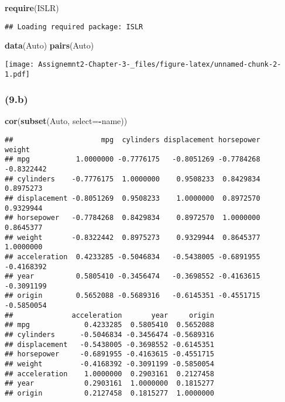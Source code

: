 \documentclass[]{article}
\newenvironment{Shaded}{\begin{snugshade}}{\end{snugshade}}
\newcommand{\DataTypeTok}[1]{\textcolor[rgb]{0.13,0.29,0.53}{#1}}
\newcommand{\KeywordTok}[1]{\textcolor[rgb]{0.13,0.29,0.53}{\textbf{#1}}}
\newcommand{\NormalTok}[1]{#1}
\newcommand{\OperatorTok}[1]{\textcolor[rgb]{0.81,0.36,0.00}{\textbf{#1}}}
\begin{document}
\begin{Shaded}
\begin{Highlighting}[]
\KeywordTok{require}\NormalTok{(ISLR)}
\end{Highlighting}
\end{Shaded}

\begin{verbatim}
## Loading required package: ISLR
\end{verbatim}

\begin{Shaded}
\begin{Highlighting}[]
\KeywordTok{data}\NormalTok{(Auto)}
\KeywordTok{pairs}\NormalTok{(Auto)}
\end{Highlighting}
\end{Shaded}

\texttt{[image: Assignemnt2-Chapter-3-\_files/figure-latex/unnamed-chunk-2-1.pdf]}

\hypertarget{b-1}{%
\subsubsection{(9.b)}\label{b-1}}

\begin{Shaded}
\begin{Highlighting}[]
\KeywordTok{cor}\NormalTok{(}\KeywordTok{subset}\NormalTok{(Auto, }\DataTypeTok{select=}\OperatorTok{-}\NormalTok{name))}
\end{Highlighting}
\end{Shaded}

\begin{verbatim}
##                     mpg  cylinders displacement horsepower     weight
## mpg           1.0000000 -0.7776175   -0.8051269 -0.7784268 -0.8322442
## cylinders    -0.7776175  1.0000000    0.9508233  0.8429834  0.8975273
## displacement -0.8051269  0.9508233    1.0000000  0.8972570  0.9329944
## horsepower   -0.7784268  0.8429834    0.8972570  1.0000000  0.8645377
## weight       -0.8322442  0.8975273    0.9329944  0.8645377  1.0000000
## acceleration  0.4233285 -0.5046834   -0.5438005 -0.6891955 -0.4168392
## year          0.5805410 -0.3456474   -0.3698552 -0.4163615 -0.3091199
## origin        0.5652088 -0.5689316   -0.6145351 -0.4551715 -0.5850054
##              acceleration       year     origin
## mpg             0.4233285  0.5805410  0.5652088
## cylinders      -0.5046834 -0.3456474 -0.5689316
## displacement   -0.5438005 -0.3698552 -0.6145351
## horsepower     -0.6891955 -0.4163615 -0.4551715
## weight         -0.4168392 -0.3091199 -0.5850054
## acceleration    1.0000000  0.2903161  0.2127458
## year            0.2903161  1.0000000  0.1815277
## origin          0.2127458  0.1815277  1.0000000
\end{verbatim}
\end{document}
